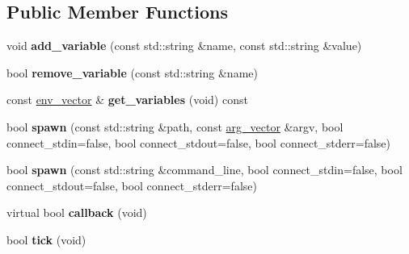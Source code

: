 \subsection*{Public Member Functions}
\begin{DoxyCompactItemize}
\item 
void {\bfseries add\+\_\+variable} (const std\+::string \&name, const std\+::string \&value)\hypertarget{classstlplus_1_1async__subprocess_a8b83b2fd328f89989e0128c98c7e593d}{}\label{classstlplus_1_1async__subprocess_a8b83b2fd328f89989e0128c98c7e593d}

\item 
bool {\bfseries remove\+\_\+variable} (const std\+::string \&name)\hypertarget{classstlplus_1_1async__subprocess_aa44fabb31662f1feaf33f56dec79520b}{}\label{classstlplus_1_1async__subprocess_aa44fabb31662f1feaf33f56dec79520b}

\item 
const \hyperlink{classstlplus_1_1env__vector}{env\+\_\+vector} \& {\bfseries get\+\_\+variables} (void) const \hypertarget{classstlplus_1_1async__subprocess_a91262a1f15dfd305dbaee444810c508a}{}\label{classstlplus_1_1async__subprocess_a91262a1f15dfd305dbaee444810c508a}

\item 
bool {\bfseries spawn} (const std\+::string \&path, const \hyperlink{classstlplus_1_1arg__vector}{arg\+\_\+vector} \&argv, bool connect\+\_\+stdin=false, bool connect\+\_\+stdout=false, bool connect\+\_\+stderr=false)\hypertarget{classstlplus_1_1async__subprocess_a69dea3289df0358f483f266b5322c8c7}{}\label{classstlplus_1_1async__subprocess_a69dea3289df0358f483f266b5322c8c7}

\item 
bool {\bfseries spawn} (const std\+::string \&command\+\_\+line, bool connect\+\_\+stdin=false, bool connect\+\_\+stdout=false, bool connect\+\_\+stderr=false)\hypertarget{classstlplus_1_1async__subprocess_a4d144da6a078bd9808ac36dbb78d937c}{}\label{classstlplus_1_1async__subprocess_a4d144da6a078bd9808ac36dbb78d937c}

\item 
virtual bool {\bfseries callback} (void)\hypertarget{classstlplus_1_1async__subprocess_a3781787312573682de802ca876b9d1ec}{}\label{classstlplus_1_1async__subprocess_a3781787312573682de802ca876b9d1ec}

\item 
bool {\bfseries tick} (void)\hypertarget{classstlplus_1_1async__subprocess_a6ebf98c08e30e5ef644d0114196463e3}{}\label{classstlplus_1_1async__subprocess_a6ebf98c08e30e5ef644d0114196463e3}


\end{DoxyCompactItemize}

